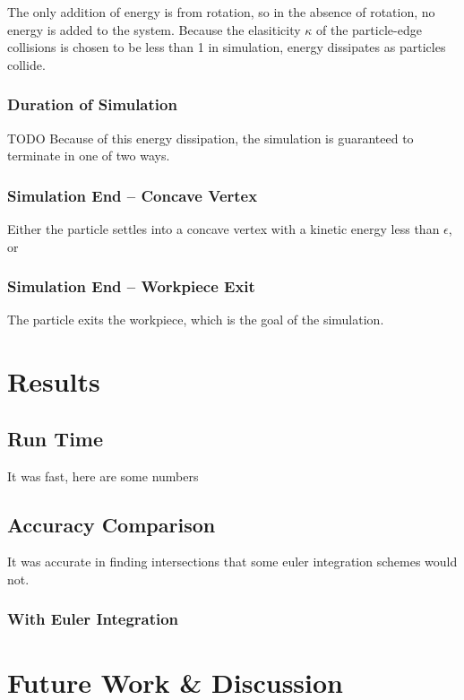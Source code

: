 		The only addition of energy is from rotation, so in the absence of rotation, no energy is added to the system. Because the elasiticity $\kappa$ of the particle-edge collisions is chosen to be less than 1 in simulation, energy dissipates as particles collide.

		\subsubsection{Duration of Simulation}
TODO
		Because of this energy dissipation, the simulation is guaranteed to terminate in one of two ways.

		\subsubsection{Simulation End -- Concave Vertex}

		Either the particle settles into a concave vertex with a kinetic energy less than $\epsilon$, or

		\subsubsection{Simulation End -- Workpiece Exit}

		The particle exits the workpiece, which is the goal of the simulation.

\section{Results}

	\subsection{Run Time}

	It was fast, here are some numbers

	\subsection{Accuracy Comparison}

	It was accurate in finding intersections that some euler integration schemes would not.

		\subsubsection{With Euler Integration}

\section{Future Work \& Discussion}

